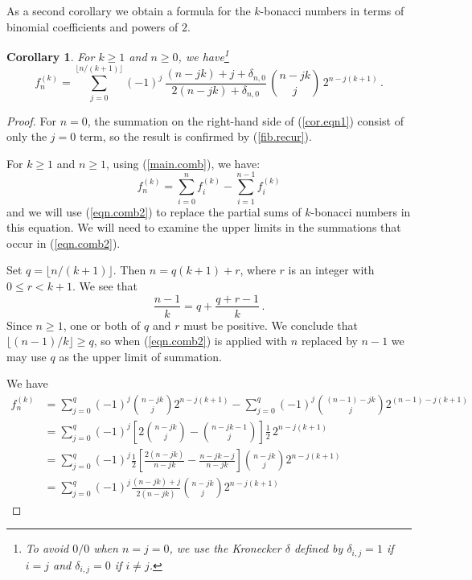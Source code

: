 \documentclass[11pt,reqno]{amsart}
\theoremstyle{plain}
\numberwithin{equation}{section}
\newtheorem{corollary}[thm]{Corollary}
\begin{document}
As a second  corollary we obtain a formula for the 
$k$-bonacci numbers
in terms of binomial coefficients and powers of $2$.
\begin{corollary}\label{main.cor}
For  $k\geq 1$ and $n \geq 0$, we have\footnote{To avoid  $0/0$  when
$n=j=0$, we use the 
Kronecker $\delta$ defined by $\delta_{i, j} = 1$
if $i=j$ and $\delta_{i, j} = 0$ if $i\neq j$.}
\begin{equation}\label{cor.eqn1}
f_{n}^{(k)}= 
\sum_{j=0}^{\lfloor n/(k+1)\rfloor} (-1)^j\,
\frac{(n-jk)+j+\delta_{n,0}}{2(n-jk)+\delta_{n,0}}\,  \binom{n-jk}{j} \,  2^{n-j(k+1)}
\,.
\end{equation}
\end{corollary}
\begin{proof} 
For $n= 0$, the summation on the right-hand side of  (\ref{cor.eqn1})
consist of only the $j=0$ term, so  the result is confirmed by (\ref{fib.recur}).

For  $k\geq 1$ and $n \geq 1$,
using (\ref{main.comb}), we have:
\[
f_{n}^{(k)}=
\sum_{i=0}^{n} f_i^{(k)} 
- \sum_{i=1}^{n-1} f_i^{(k)}
\]
and we will use    (\ref{eqn.comb2}) 
to replace the partial sums of  $k$-bonacci numbers in this equation.
We will  need to examine the upper limits in the summations that
occur  in  (\ref{eqn.comb2}).

Set $q = \lfloor n/(k+1)\rfloor $.  Then $n = q(k+1) + r$, where
$r$ is an integer with $0\leq r < k+1$.
We  see that 
$$
\frac{n-1}{k} = q + \frac{q+r-1}{k}
\,.
$$
Since $n\geq 1$, one or both of $q$ and $r$ must be positive.
We conclude that $\lfloor (n-1)/k \rfloor \geq q$, so
when    (\ref{eqn.comb2})  is applied with $n$ replaced by $n-1$
we may use $q$ as  the upper limit of summation.

We have
\begin{align}\nonumber
	f_{n}^{(k)} 
\nonumber
		&=\sum_{j=0}^{q} (-1)^{j} \binom{n-jk}{j}2^{n-j(k+1)} 
		- \sum_{j=0}^{q} (-1)^{j} \binom{(n-1)-jk}{j}2^{(n-1)-j(k+1)} \\
\nonumber %
		&=\sum_{j=0}^{q} (-1)^{j}  \left[ 2 \binom{n-jk}{j}- \binom{n-jk-1}{j} \right] \frac12\, 2^{n-j(k+1)} \\
\nonumber
		&=\sum_{j=0}^{q} (-1)^{j} 
		\frac12 \left[ \frac{2(n-jk)}{n-jk}  - \frac{n-jk-j}{n-jk} \right] \binom{n-jk}{j} 2^{n-j(k+1)} \\
\nonumber
		&=\sum_{j=0}^{q} (-1)^{j} 
	 \frac{(n-jk) + j}{2(n-jk)}  \binom{n-jk}{j} 2^{n-j(k+1)} 
\end{align}
	 

\end{proof}
\end{document}
